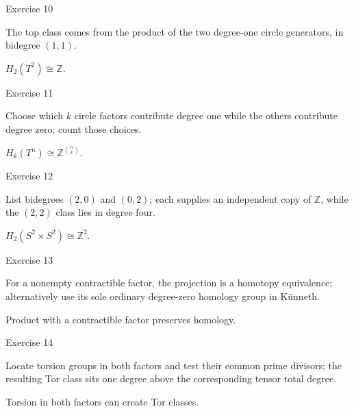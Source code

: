 \begin{exercise}\label{exr:viii27-10}
Exercise 10
\end{exercise}
\begin{hint}
The top class comes from the product of the two degree-one circle generators, in bidegree \((1,1)\).
\end{hint}
\begin{solution}
\(H_2(T^2)\cong\mathbb Z\).
\end{solution}

\begin{exercise}\label{exr:viii27-11}
Exercise 11
\end{exercise}
\begin{hint}
Choose which \(k\) circle factors contribute degree one while the others contribute degree zero; count those choices.
\end{hint}
\begin{solution}
\(H_k(T^n)\cong\mathbb Z^{\binom nk}\).
\end{solution}

\begin{exercise}\label{exr:viii27-12}
Exercise 12
\end{exercise}
\begin{hint}
List bidegrees \((2,0)\) and \((0,2)\); each supplies an independent copy of \(\mathbb Z\), while the \((2,2)\) class lies in degree four.
\end{hint}
\begin{solution}
\(H_2(S^2\times S^2)\cong\mathbb Z^2\).
\end{solution}

\begin{exercise}\label{exr:viii27-13}
Exercise 13
\end{exercise}
\begin{hint}
For a nonempty contractible factor, the projection is a homotopy equivalence; alternatively use its sole ordinary degree-zero homology group in Künneth.
\end{hint}
\begin{solution}
Product with a contractible factor preserves homology.
\end{solution}

\begin{exercise}\label{exr:viii27-14}
Exercise 14
\end{exercise}
\begin{hint}
Locate torsion groups in both factors and test their common prime divisors; the resulting Tor class sits one degree above the corresponding tensor total degree.
\end{hint}
\begin{solution}
Torsion in both factors can create Tor classes.
\end{solution}

